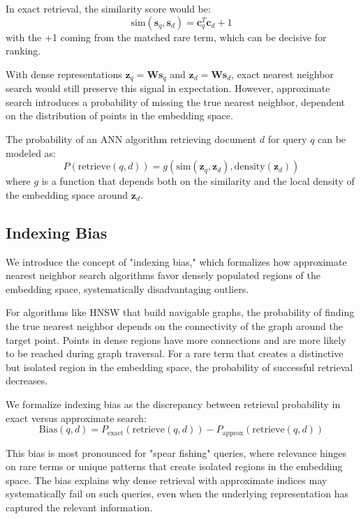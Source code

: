\documentclass[sigconf,review]{acmart}
\begin{document}
In exact retrieval, the similarity score would be:
\begin{equation}
\text{sim}(\mathbf{s}_q, \mathbf{s}_d) = \mathbf{c}_q^T\mathbf{c}_d + 1
\end{equation}
with the +1 coming from the matched rare term, which can be decisive for ranking.

With dense representations $\mathbf{z}_q = \mathbf{W}\mathbf{s}_q$ and $\mathbf{z}_d = \mathbf{W}\mathbf{s}_d$, exact nearest neighbor search would still preserve this signal in expectation. However, approximate search introduces a probability of missing the true nearest neighbor, dependent on the distribution of points in the embedding space.

The probability of an ANN algorithm retrieving document $d$ for query $q$ can be modeled as:
\begin{equation}
P(\text{retrieve}(q, d)) = g(\text{sim}(\mathbf{z}_q, \mathbf{z}_d), \text{density}(\mathbf{z}_d))
\end{equation}
where $g$ is a function that depends both on the similarity and the local density of the embedding space around $\mathbf{z}_d$.

\subsection{Indexing Bias}
We introduce the concept of "indexing bias," which formalizes how approximate nearest neighbor search algorithms favor densely populated regions of the embedding space, systematically disadvantaging outliers.

For algorithms like HNSW that build navigable graphs, the probability of finding the true nearest neighbor depends on the connectivity of the graph around the target point. Points in dense regions have more connections and are more likely to be reached during graph traversal. For a rare term that creates a distinctive but isolated region in the embedding space, the probability of successful retrieval decreases.

We formalize indexing bias as the discrepancy between retrieval probability in exact versus approximate search:
\begin{equation}
\text{Bias}(q, d) = P_{\text{exact}}(\text{retrieve}(q, d)) - P_{\text{approx}}(\text{retrieve}(q, d))
\end{equation}

This bias is most pronounced for "spear fishing" queries, where relevance hinges on rare terms or unique patterns that create isolated regions in the embedding space. The bias explains why dense retrieval with approximate indices may systematically fail on such queries, even when the underlying representation has captured the relevant information.
\end{document}
